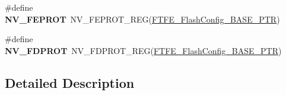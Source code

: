 \begin{DoxyCompactItemize}
\item 
\hypertarget{group___n_v___register___accessor___macros_ga042021b7c9ba543352055825ab37f11b}{}\#define {\bfseries N\+V\+\_\+\+F\+E\+P\+R\+O\+T}~N\+V\+\_\+\+F\+E\+P\+R\+O\+T\+\_\+\+R\+E\+G(\hyperlink{group___n_v___peripheral_ga824c84d1d5dcc180128d85f4f676b4c5}{F\+T\+F\+E\+\_\+\+Flash\+Config\+\_\+\+B\+A\+S\+E\+\_\+\+P\+T\+R})\label{group___n_v___register___accessor___macros_ga042021b7c9ba543352055825ab37f11b}

\item 
\hypertarget{group___n_v___register___accessor___macros_gaa36202cc8cc9caa02eee166ffce5efc6}{}\#define {\bfseries N\+V\+\_\+\+F\+D\+P\+R\+O\+T}~N\+V\+\_\+\+F\+D\+P\+R\+O\+T\+\_\+\+R\+E\+G(\hyperlink{group___n_v___peripheral_ga824c84d1d5dcc180128d85f4f676b4c5}{F\+T\+F\+E\+\_\+\+Flash\+Config\+\_\+\+B\+A\+S\+E\+\_\+\+P\+T\+R})\label{group___n_v___register___accessor___macros_gaa36202cc8cc9caa02eee166ffce5efc6}

\end{DoxyCompactItemize}


\subsection{Detailed Description}
